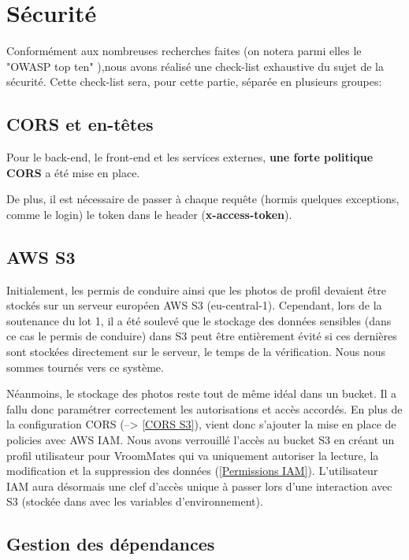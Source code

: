 \chapter{Sécurité}
Conformément aux nombreuses recherches faites (on notera parmi elles le "OWASP top ten" \parencite{Ref1}),nous avons réalisé une check-list exhaustive du sujet de la sécurité. Cette check-list sera, pour cette partie, séparée en plusieurs groupes:
 
\section{CORS et en-têtes}

Pour le back-end, le front-end et les services externes, \textbf{une forte politique CORS} a été mise en place.

De plus, il est nécessaire de passer à chaque requête (hormis quelques exceptions, comme le login) le token dans le header (\textbf{x-access-token}).

\section{AWS S3}

Initialement, les permis de conduire ainsi que les photos de profil devaient être stockés sur un serveur européen AWS S3 (eu-central-1). Cependant, lors de la soutenance du lot 1, il a été soulevé que le stockage des données sensibles (dans ce cas le permis de conduire) dans S3 peut être entièrement évité si ces dernières sont stockées directement sur le serveur, le temps de la vérification. Nous nous sommes tournés vers ce système.

Néanmoins, le stockage des photos reste tout de même idéal dans un bucket. Il a fallu donc paramétrer correctement les autorisations et accès accordés. En plus de la configuration CORS (--> \ref{CORS S3}), vient donc s'ajouter la mise en place de policies avec AWS IAM. Nous avons verrouillé l'accès au bucket S3 en créant un profil utilisateur pour VroomMates qui va uniquement autoriser la lecture, la modification et la suppression des données (\ref{Permissions IAM}). L'utilisateur IAM aura désormais une clef d'accès unique à passer lors d'une interaction avec S3 (stockée dans avec les variables d'environnement).


\section{Gestion des dépendances}

